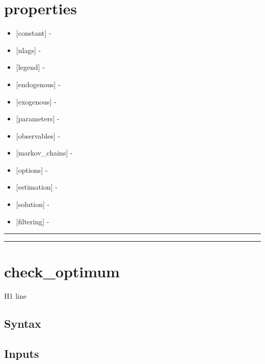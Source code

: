 \documentclass[letterpaper,10pt,english]{sphinxmanual}
\begin{document}
\section{properties}
\label{classes/models/@svar/svar:properties}\begin{itemize}
\item {} 
{[}constant{]} -

\item {} 
{[}nlags{]} -

\item {} 
{[}legend{]} -

\item {} 
{[}endogenous{]} -

\item {} 
{[}exogenous{]} -

\item {} 
{[}parameters{]} -

\item {} 
{[}observables{]} -

\item {} 
{[}markov\_chains{]} -

\item {} 
{[}options{]} -

\item {} 
{[}estimation{]} -

\item {} 
{[}solution{]} -

\item {} 
{[}filtering{]} -

\end{itemize}


\bigskip\hrule{}\bigskip



\bigskip\hrule{}\bigskip



\section{check\_optimum}
\label{classes/models/@svar/svar:check-optimum}\label{classes/models/@svar/svar:id1}
H1 line


\subsection{Syntax}
\label{classes/models/@svar/svar:syntax}

\subsection{Inputs}
\label{classes/models/@svar/svar:inputs}
\end{document}
